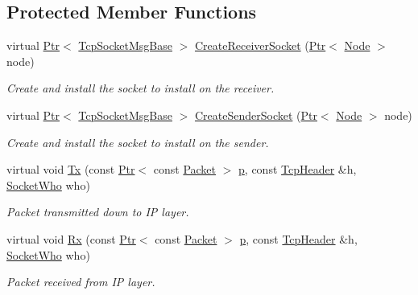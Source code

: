\subsection*{Protected Member Functions}
\begin{DoxyCompactItemize}
\item 
virtual \hyperlink{classns3_1_1Ptr}{Ptr}$<$ \hyperlink{classns3_1_1TcpSocketMsgBase}{Tcp\+Socket\+Msg\+Base} $>$ \hyperlink{classTimestampTestCase_a391b0d079e952d9ab76bfc10134c41a4}{Create\+Receiver\+Socket} (\hyperlink{classns3_1_1Ptr}{Ptr}$<$ \hyperlink{classns3_1_1Node}{Node} $>$ node)
\begin{DoxyCompactList}\small\item\em Create and install the socket to install on the receiver. \end{DoxyCompactList}\item 
virtual \hyperlink{classns3_1_1Ptr}{Ptr}$<$ \hyperlink{classns3_1_1TcpSocketMsgBase}{Tcp\+Socket\+Msg\+Base} $>$ \hyperlink{classTimestampTestCase_a0b1b0ff811a6c57f02c818db1d4b803e}{Create\+Sender\+Socket} (\hyperlink{classns3_1_1Ptr}{Ptr}$<$ \hyperlink{classns3_1_1Node}{Node} $>$ node)
\begin{DoxyCompactList}\small\item\em Create and install the socket to install on the sender. \end{DoxyCompactList}\item 
virtual void \hyperlink{classTimestampTestCase_a02dd67f62592b9ccd000ddd8f648d71e}{Tx} (const \hyperlink{classns3_1_1Ptr}{Ptr}$<$ const \hyperlink{classns3_1_1Packet}{Packet} $>$ \hyperlink{lte__link__budget__x2__handover__measures_8m_ac9de518908a968428863f829398a4e62}{p}, const \hyperlink{classns3_1_1TcpHeader}{Tcp\+Header} \&h, \hyperlink{classns3_1_1TcpGeneralTest_a29338e6b7137cad650c2ff835713f6ee}{Socket\+Who} who)
\begin{DoxyCompactList}\small\item\em Packet transmitted down to IP layer. \end{DoxyCompactList}\item 
virtual void \hyperlink{classTimestampTestCase_ad5630adb98598f6e7e25f4e359704bda}{Rx} (const \hyperlink{classns3_1_1Ptr}{Ptr}$<$ const \hyperlink{classns3_1_1Packet}{Packet} $>$ \hyperlink{lte__link__budget__x2__handover__measures_8m_ac9de518908a968428863f829398a4e62}{p}, const \hyperlink{classns3_1_1TcpHeader}{Tcp\+Header} \&h, \hyperlink{classns3_1_1TcpGeneralTest_a29338e6b7137cad650c2ff835713f6ee}{Socket\+Who} who)
\begin{DoxyCompactList}\small\item\em Packet received from IP layer. \end{DoxyCompactList}\end{DoxyCompactItemize}
